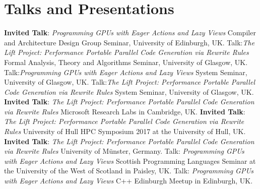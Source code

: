 \documentclass[11pt,a4paper]{moderncv}
\begin{document}
\section{Talks and Presentations}
         {\textbf{Invited Talk}:\newline
          \emph{Programming GPUs with Eager Actions and Lazy Views}\newline
         \small Compiler and Architecture Design Group Seminar, University of Edinburgh, UK.}
         {Talk:\emph{The Lift Project: Performance Portable Parallel Code Generation via Rewrite Rules}\newline
         \small Formal Analysis, Theory and Algorithms Seminar, University of Glasgow, UK.}
         {Talk:\emph{Programming GPUs with Eager Actions and Lazy Views}\newline
         \small System Seminar, University of Glasgow, UK.}
         {Talk:\emph{The Lift Project: Performance Portable Parallel Code Generation via Rewrite Rules}\newline
         \small System Seminar, University of Glasgow, UK.}
         {\textbf{Invited Talk}:\newline
          \emph{The Lift Project: Performance Portable Parallel Code Generation via Rewrite Rules}\newline
         \small Microsoft Research Labs in Cambridge, UK.}
         {\textbf{Invited Talk}:\newline
          \emph{The Lift Project: Performance Portable Parallel Code Generation via Rewrite Rules}\newline
         \small University of Hull HPC Symposium 2017 at the University of Hull, UK.}
         {\textbf{Invited Talk}:\newline
          \emph{The Lift Project: Performance Portable Parallel Code Generation via Rewrite Rules}\newline
         \small University of Münster, Germany.}
         {Talk: \emph{Programming GPUs with Eager Actions and Lazy Views}\newline
         \small Scottish Programming Languages Seminar at the University of the West of Scotland in Paisley, UK.}
         {Talk: \emph{Programming GPUs with Eager Actions and Lazy Views}\newline
         \small C++ Edinburgh Meetup in Edinburgh, UK.}
\end{document}
